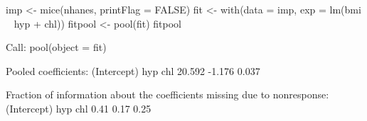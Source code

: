 \begin{Schunk}
\begin{Sinput}
 imp <- mice(nhanes, printFlag = FALSE) 
 fit <- with(data = imp, exp = lm(bmi ~ hyp + chl))
 fitpool <- pool(fit)
 fitpool
\end{Sinput}
\begin{Soutput}
Call: pool(object = fit)

Pooled coefficients:
(Intercept)         hyp         chl 
     20.592      -1.176       0.037 

Fraction of information about the coefficients missing due to nonresponse: 
(Intercept)         hyp         chl 
       0.41        0.17        0.25 
\end{Soutput}
\end{Schunk}
